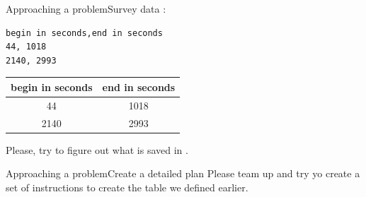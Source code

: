\documentclass[aspectratio=169]{beamer}
\begin{document}
\begin{frame}[fragile]{Approaching a problem}{Survey data}
:

\begin{lstlisting}
begin in seconds,end in seconds
44, 1018
2140, 2993
\end{lstlisting}
\pause
\vspace{1em}
\begin{tabular}{cc}
	begin in seconds & end in seconds \\
	\midrule
	44 & 1018 \\
	2140 & 2993 \\
\end{tabular}

\pause

\vspace{1em}
Please, try to figure out what is saved in .
\end{frame}

\begin{frame}{Approaching a problem}{Create a detailed plan}
	Please team up and try yo create a set of instructions to create the table we defined earlier.
\end{frame}
\end{document}
